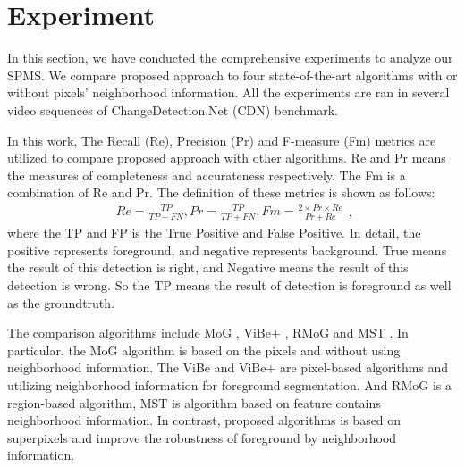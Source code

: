 \documentclass[runningheads,a4paper]{llncs}
\begin{document}
\section{Experiment}
In this section, we have conducted the comprehensive experiments to
analyze our SPMS.
We compare proposed approach to four state-of-the-art algorithms with
or without pixels' neighborhood information.
All the experiments are ran in several video sequences of
ChangeDetection.Net \cite{2014_CVPR_CDnet_Wang} (CDN) benchmark.

In this work, The Recall (Re), Precision (Pr) and F-measure (Fm) metrics
are utilized to compare proposed approach with other algorithms.
Re and Pr means the measures of completeness and accurateness
respectively. The Fm is a combination of Re and Pr. The definition of
these metrics is shown as follows:
\begin{equation}
    \begin{aligned}
        Re = \frac{TP}{TP + FN},
        Pr = \frac{TP}{TP + FN},
        Fm = \frac{2 \times Pr \times Re}{Pr + Re}
    \end{aligned},
\end{equation}
where the TP and FP is the True Positive and False Positive. In detail,
the positive represents foreground, and negative represents background.
True means the result of this detection is right, and Negative means the
result of this detection is wrong. So the TP means the result of
detection is foreground as well as the groundtruth.

The comparison algorithms include MoG \cite{2004_ICPR_iMoG}, ViBe+
\cite{2011_TIP_ViBep}, RMoG \cite{2013_ICAVSBS_RMoG} and MST
\cite{2014_ICIP_MST}.
In particular, the MoG algorithm is based on the pixels and without using
neighborhood information.
The ViBe and ViBe+ are pixel-based algorithms and utilizing neighborhood information 
for foreground segmentation.
And RMoG is a region-based algorithm, MST is algorithm based on feature
contains neighborhood information.
In contrast, proposed algorithms is based on superpixels and improve the
robustness of foreground by neighborhood information.
\end{document}
